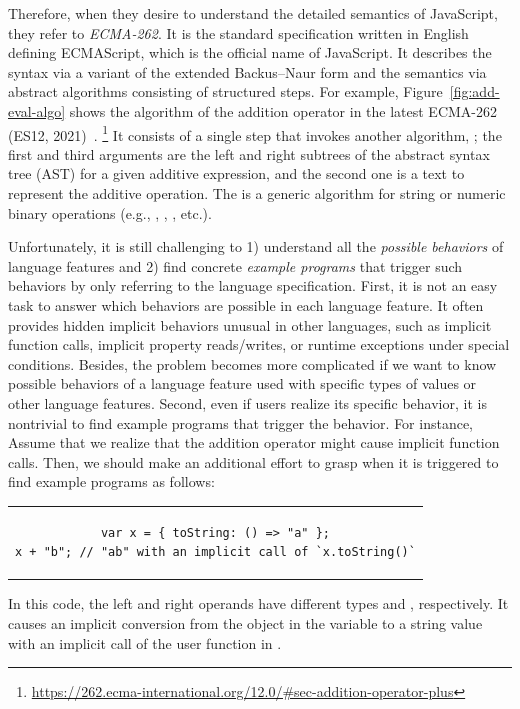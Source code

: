 Therefore, when they desire to understand the detailed semantics of JavaScript,
they refer to \textit{ECMA-262}.  It is the standard specification written in
English defining ECMAScript, which is the official name of JavaScript.  It
describes the syntax via a variant of the extended Backus–Naur form and the
semantics via abstract algorithms consisting of structured steps.  For example,
Figure~\ref{fig:add-eval-algo} shows the  algorithm of the
addition operator in the latest ECMA-262 (ES12, 2021)~\cite{es12}.
\footnote{\url{https://262.ecma-international.org/12.0/\#sec-addition-operator-plus}}
It consists of a single step that invokes another algorithm,
; the first and third arguments
are the left and right subtrees of the abstract syntax tree (AST) for a given
additive expression, and the second one is a text \code{+} to represent the
additive operation.  The  is a
generic algorithm for string or numeric binary operations (e.g., \code{-},
\code{*}, \code{<}, etc.).

Unfortunately, it is still challenging to 1) understand all the \textit{possible
behaviors} of language features and 2) find concrete \textit{example programs}
that trigger such behaviors by only referring to the language specification.
First, it is not an easy task to answer which behaviors are possible in each
language feature.  It often provides hidden implicit behaviors unusual in other
languages, such as implicit function calls, implicit property reads/writes, or
runtime exceptions under special conditions.  Besides, the problem becomes more
complicated if we want to know possible behaviors of a language feature used with
specific types of values or other language features.  Second, even if users
realize its specific behavior, it is nontrivial to find example programs that
trigger the behavior.  For instance, Assume that we realize that the addition
operator might cause implicit function calls.  Then, we should make an
additional effort to grasp when it is triggered to find example programs as
follows:
\begin{center}
  \begin{tabular}{c}
    \begin{lstlisting}[style=JS]
var x = { toString: () => "a" };
x + "b"; // "ab" with an implicit call of `x.toString()`
    \end{lstlisting}
  \end{tabular}
\end{center}
In this code, the left and right operands have different types  and
, respectively.  It causes an implicit conversion from the object
in the variable  to a string value with an implicit call of the user
function in .

